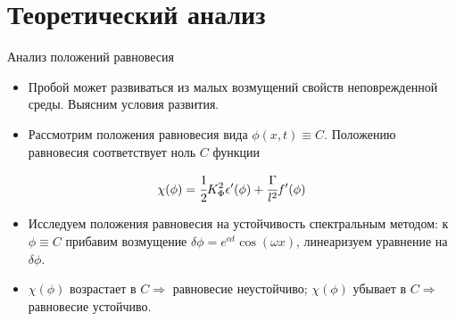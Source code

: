 \section{Теоретический анализ}

\begin{frame}{Анализ положений равновесия}
\begin{itemize}
	\item Пробой может развиваться из малых возмущений свойств неповрежденной среды. Выясним
	условия развития.
	\item Рассмотрим положения равновесия вида $\phi(x, t) \equiv C$. Положению равновесия
	соответствует ноль $C$ функции
\end{itemize}
$$\chi(\phi) = \cfrac{1}{2} K_\Phi^2 \epsilon'(\phi) + \cfrac{\Gamma}{l^2} f'(\phi)$$
\vspace{-0.5cm}
\begin{itemize}
	\item Исследуем положения равновесия на устойчивость спектральным методом: к $\phi \equiv C$
	прибавим возмущение $\delta \phi = e^{\alpha t}\cos(\omega x)$, линеаризуем уравнение на
	$\delta \phi$.
	\item $\chi(\phi)$ возрастает в $C \Longrightarrow$ равновесие неустойчиво; $\chi(\phi)$
	убывает в $C \Longrightarrow$ равновесие устойчиво.
\end{itemize}
\end{frame}


